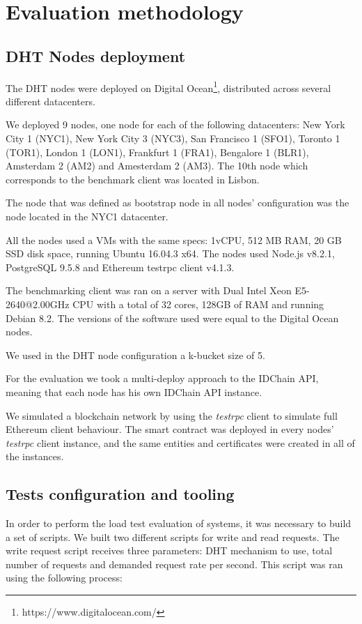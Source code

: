 \section{Evaluation methodology}
\label{section:methodology}

\subsection{DHT Nodes deployment}


The DHT nodes were deployed on Digital Ocean\footnote{https://www.digitalocean.com/}, distributed across several different datacenters.

We deployed 9 nodes, one node for each of the following datacenters: New York City 1 (NYC1), New York City 3 (NYC3), San Francisco 1 (SFO1), Toronto 1 (TOR1), London 1 (LON1), Frankfurt 1 (FRA1), Bengalore 1 (BLR1), Amsterdam 2 (AM2) and Amesterdam 2 (AM3).
The 10th node which corresponds to the benchmark client was located in Lisbon.

The node that was defined as bootstrap node in all nodes' configuration was the node located in the NYC1 datacenter.

All the nodes used a \acp{VM} with the same specs: 1vCPU, 512 MB RAM, 20 GB SSD disk space, running Ubuntu 16.04.3 x64.
The nodes used Node.js v8.2.1, PostgreSQL 9.5.8 and Ethereum testrpc client v4.1.3.

The benchmarking client was ran on a server with Dual Intel Xeon E5-2640@2.00GHz CPU with a total of 32 cores, 128GB of RAM and running Debian 8.2.
The versions of the software used were equal to the Digital Ocean nodes.

We used in the DHT node configuration a k-bucket size of 5.

For the evaluation we took a multi-deploy approach to the IDChain API, meaning that each node has his own IDChain API instance.

We simulated a blockchain network by using the \textit{testrpc} client to simulate full Ethereum client behaviour.
The smart contract was deployed in every nodes' \textit{testrpc} client instance, and the same entities and certificates were created in all of the instances.

\subsection{Tests configuration and tooling}

In order to perform the load test evaluation of systems, it was necessary to build a set of scripts.
We built two different scripts for write and read requests.
The write request script receives three parameters: DHT mechanism to use, total number of requests and demanded request rate per second.
This script was ran using the following process:

